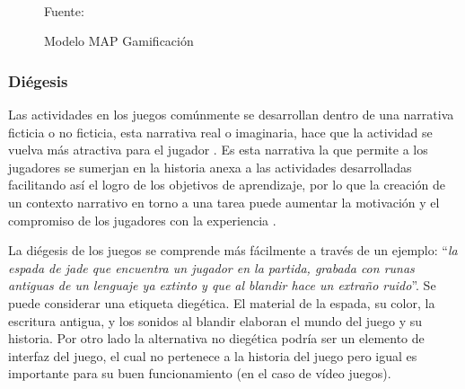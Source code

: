 \begin{figure}[ht]
\caption{Modelo MAP Gamificación}
\label{img:MAP}
\centering
{}
\\
{\footnotesize Fuente: }
\end{figure}

\subsubsection{Diégesis}

Las actividades en los juegos comúnmente se desarrollan dentro de una narrativa ficticia o no ficticia, esta 
narrativa real o imaginaria, hace que la actividad se vuelva más atractiva para el jugador
\cite{AURA2021101728}. Es esta narrativa la que permite a los jugadores se sumerjan en la historia 
anexa a las actividades desarrolladas facilitando así el logro de los objetivos de aprendizaje, por lo
que la creación de un contexto narrativo en torno a una tarea puede aumentar la motivación y el compromiso de
los jugadores con la experiencia \cite{CECHELLA2018}.

La diégesis de los juegos se comprende más fácilmente a través de un ejemplo: ``{\it la espada de jade que 
encuentra un jugador en la partida, grabada con runas antiguas de un lenguaje ya extinto y que al blandir 
hace un extraño ruido}''. Se puede considerar una etiqueta diegética. El material de la espada, su color, la 
escritura antigua, y los sonidos al blandir elaboran el mundo del juego y su historia. Por otro lado la 
alternativa no diegética podría ser un elemento de interfaz del juego, el cual no pertenece a la historia del
juego pero igual es importante para su buen funcionamiento (en el caso de vídeo juegos).

